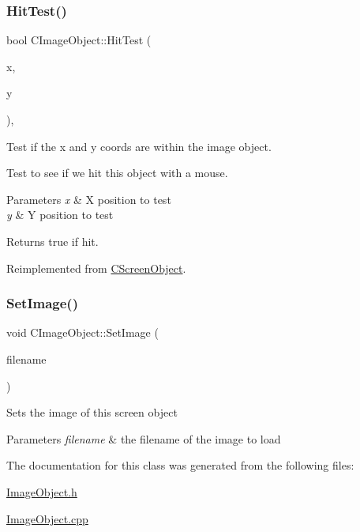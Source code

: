 \mbox{\label{class_c_image_object_a0b8db07f55fa820b3683d2a99d553120}} 
\subsubsection{\texorpdfstring{HitTest()}{HitTest()}}
{\footnotesize\ttfamily bool C\+Image\+Object\+::\+Hit\+Test (\begin{DoxyParamCaption}\item[{int}]{x,  }\item[{int}]{y }\end{DoxyParamCaption})\hspace{0.3cm}{\ttfamily [override]}, {\ttfamily [virtual]}}



Test if the x and y coords are within the image object. 

Test to see if we hit this object with a mouse. 
\begin{DoxyParams}{Parameters}
{\em x} & X position to test \\
\hline
{\em y} & Y position to test \\
\hline
\end{DoxyParams}
\begin{DoxyReturn}{Returns}
true if hit. 
\end{DoxyReturn}


Reimplemented from \mbox{\hyperlink{class_c_screen_object_a92a3f69608fa214184c0c82a33569a07}{C\+Screen\+Object}}.

\mbox{\label{class_c_image_object_adbcb139e0a30fb3e31c70d0830723577}} 
\subsubsection{\texorpdfstring{SetImage()}{SetImage()}}
{\footnotesize\ttfamily void C\+Image\+Object\+::\+Set\+Image (\begin{DoxyParamCaption}\item[{const W\+C\+H\+AR $\ast$}]{filename }\end{DoxyParamCaption})\hspace{0.3cm}{\ttfamily [inline]}}

Sets the image of this screen object 
\begin{DoxyParams}{Parameters}
{\em filename} & the filename of the image to load \\
\hline
\end{DoxyParams}


The documentation for this class was generated from the following files\+:\begin{DoxyCompactItemize}
\item 
\mbox{\hyperlink{_image_object_8h}{Image\+Object.\+h}}\item 
\mbox{\hyperlink{_image_object_8cpp}{Image\+Object.\+cpp}}\end{DoxyCompactItemize}
